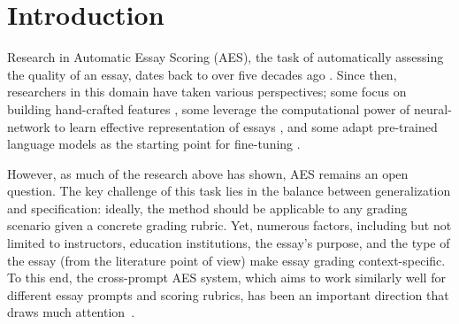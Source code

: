 \section{Introduction}
\label{introduction}
Research in Automatic Essay Scoring (AES), the task of automatically assessing the quality of an essay, dates back to over five decades ago \cite{page1968}. Since then, researchers in this domain have taken various perspectives; some focus on building hand-crafted features \cite{chen-he-2013-automated, uto-etal-2020-neural}, some leverage the computational power of neural-network to learn effective representation of essays \cite{dong-etal-2017-attention, ridley2020promptagnosticessayscorer, jin-etal-2018-tdnn}, and some adapt pre-trained language models as the starting point for fine-tuning \cite{wang-etal-2022-use, hierarchicalbert}. 

However, as much of the research above has shown, AES remains an open question. The key challenge of this task lies in the balance between generalization and specification: ideally, the method should be applicable to any grading scenario given a concrete grading rubric. Yet, numerous factors, including but not limited to instructors, education institutions, the essay's purpose, and the type of the essay (from the literature point of view) make essay grading context-specific. To this end, the cross-prompt AES system, which aims to work similarly well for different essay prompts and scoring rubrics, has been an important direction that draws much attention~\cite{ridley2020promptagnosticessayscorer, jin-etal-2018-tdnn, li-ng-2024-conundrums, phandi-etal-2015-flexible,Ridley_He_Dai_Huang_Chen_2021}.


